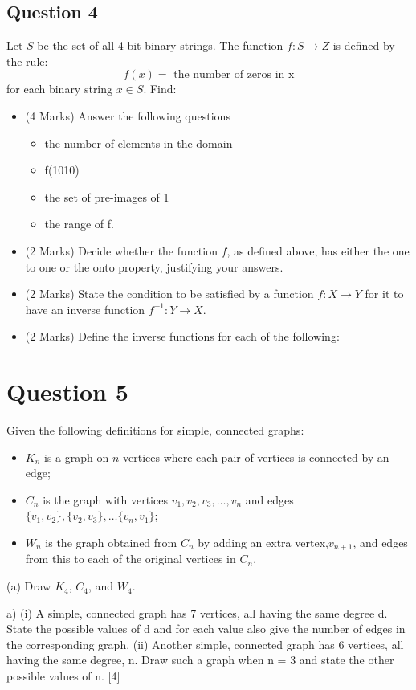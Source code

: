 \documentclass[12pt]{article} %
\begin{document}
\subsection*{Question 4}
Let $S$ be the set of all 4 bit binary strings. The function $f : S \rightarrow Z$
is defined by the rule:
\[f(x) = \mbox{ the number of zeros in x} \] for each binary string $x \in S$.
Find:
\begin{itemize}
	\item[(a)] (4 Marks) Answer the following questions
\begin{itemize}
\item[(i)] the number of elements in the domain
\item[(ii)] f(1010)
\item[(iii)] the set of pre-images of 1
\item[(iv)] the range of f. 
\end{itemize}
\item[(b)] (2 Marks) Decide whether the function $f$, as defined above, has either the one to one or
the onto property, justifying your answers. 
\item[(c)] (2 Marks) State the condition to be satisfied by a function $f : X \rightarrow Y$ for it to have an
inverse function $f^{−1} : Y \rightarrow X$.
\item[(d)] (2 Marks) Define the inverse functions for each of the following:
\end{itemize}

\section*{Question 5}
Given the following definitions for simple, connected graphs:
\begin{itemize}
	\item $K_n$ is a graph on $n$ vertices where each pair of vertices is connected by an edge;
	\item $C_n$ is the graph with vertices $v_1, v_2, v_3, \dots, v_n$ and edges $\{v_1,v_2\}, \{v_2,v_3\}, \dots\{v_n, v_1\}$;
	\item $W_n$ is the graph obtained from $C_n$ by adding an extra vertex,$v_{n+1}$, and edges
	from this to each of the original vertices in $C_n$.
\end{itemize}
(a) Draw $K_4$, $C_4$, and $W_4$. 

a) (i) A simple, connected graph has 7 vertices, all having the same degree d.
State the possible values of d and for each value also give the number of edges
in the corresponding graph.
(ii) Another simple, connected graph has 6 vertices, all having the same degree,
n. Draw such a graph when n = 3 and state the other possible values of n.
[4]
\newpage
\end{document}
